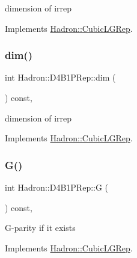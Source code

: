 dimension of irrep 

Implements \mbox{\hyperlink{structHadron_1_1CubicLGRep_a3acbaea26503ed64f20df693a48e4cdd}{Hadron\+::\+Cubic\+L\+G\+Rep}}.

\mbox{\label{structHadron_1_1D4B1PRep_aec9a69d79952beffdb9f4816ce097f30}} 
\subsubsection{\texorpdfstring{dim()}{dim()}\hspace{0.1cm}{\footnotesize\ttfamily [2/2]}}
{\footnotesize\ttfamily int Hadron\+::\+D4\+B1\+P\+Rep\+::dim (\begin{DoxyParamCaption}{ }\end{DoxyParamCaption}) const\hspace{0.3cm}{\ttfamily [inline]}, {\ttfamily [virtual]}}

dimension of irrep 

Implements \mbox{\hyperlink{structHadron_1_1CubicLGRep_a3acbaea26503ed64f20df693a48e4cdd}{Hadron\+::\+Cubic\+L\+G\+Rep}}.

\mbox{\label{structHadron_1_1D4B1PRep_adfa5387ae565f08f17ba9dc4d10c9546}} 
\subsubsection{\texorpdfstring{G()}{G()}\hspace{0.1cm}{\footnotesize\ttfamily [1/2]}}
{\footnotesize\ttfamily int Hadron\+::\+D4\+B1\+P\+Rep\+::G (\begin{DoxyParamCaption}{ }\end{DoxyParamCaption}) const\hspace{0.3cm}{\ttfamily [inline]}, {\ttfamily [virtual]}}

G-\/parity if it exists 

Implements \mbox{\hyperlink{structHadron_1_1CubicLGRep_ace26f7b2d55e3a668a14cb9026da5231}{Hadron\+::\+Cubic\+L\+G\+Rep}}.

\mbox{\label{structHadron_1_1D4B1PRep_adfa5387ae565f08f17ba9dc4d10c9546}} 

